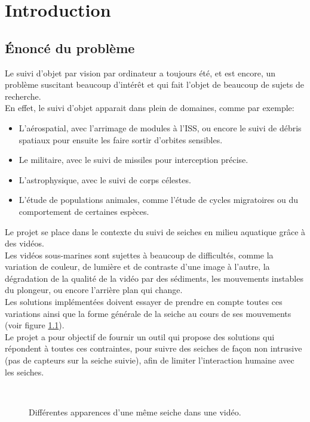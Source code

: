 \pagestyle{plain}
\chapter{Introduction}





\section{Énoncé du problème}
Le suivi d'objet par vision par ordinateur a toujours été, et est encore, un problème suscitant beaucoup d'intérêt et qui fait l'objet de beaucoup de sujets de recherche.\\
En effet, le suivi d'objet apparait dans plein de domaines, comme par exemple:
\begin{itemize}
	\item L'aérospatial, avec l'arrimage de modules à l'ISS, ou encore le suivi de débris spatiaux pour ensuite les faire sortir d'orbites sensibles.
	\item Le militaire, avec le suivi de missiles pour interception précise.
	\item L'astrophysique, avec le suivi de corps célestes.
	\item L'étude de populations animales, comme l'étude de cycles migratoires ou du comportement de certaines espèces.\\
\end{itemize}

Le projet se place dans le contexte du suivi de seiches en milieu aquatique grâce à des vidéos.\\
Les vidéos sous-marines sont sujettes à beaucoup de difficultés, comme la variation de couleur, de lumière et de contraste d'une image à l'autre, la dégradation de la qualité de la vidéo par des sédiments, les mouvements instables du plongeur, ou encore l'arrière plan qui change.\\
Les solutions implémentées doivent essayer de prendre en compte toutes ces variations ainsi que la forme générale de la seiche au cours de ses mouvements (voir figure \ref{fig:cuttlefish_variation}).\\
Le projet a pour objectif de fournir un outil qui propose des solutions qui répondent à toutes ces contraintes, pour suivre des seiches de façon non intrusive (pas de capteurs sur la seiche suivie), afin de limiter l'interaction humaine avec les seiches.

\begin{figure}[!htbp]
\center
	\hspace{0.5cm}
	\\
	\hspace{0.5cm}
\caption{Différentes apparences d'une même seiche dans une vidéo.}
\label{fig:cuttlefish_variation}
\end{figure}
\FloatBarrier
\clearpage






